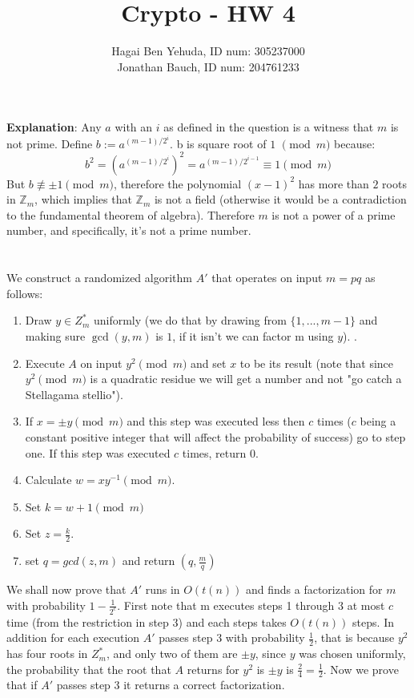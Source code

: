 \documentclass{article}
\title{Crypto - HW 4}
\author{Hagai Ben Yehuda, ID num: 305237000\\ Jonathan Bauch, ID num: 204761233}
\date{}
\begin{document}
  \maketitle

\section{} %


\textbf{Explanation}: Any $a$ with an $i$ as defined in the question is a witness that $m$ is not prime. Define $b := a^{(m-1)/2^i}$.
b is square  root of $1$ $\pmod{m}$ because:
\[ b^2 = (a^{(m-1)/2^i})^2 = a^{(m-1)/2^{i-1}} \equiv 1 \pmod{m} \]
But $b \not \equiv \pm 1 \pmod{m}$, therefore the polynomial $(x-1)^2$ has more than $2$ roots in $\mathbb{Z}_m$, which implies that $\mathbb{Z}_m$ is not a field (otherwise it would be a contradiction to the fundamental theorem of algebra). Therefore $m$ is not a power of a prime number, and specifically, it's not a prime number. 

\section{} %
We construct a randomized algorithm $A'$ that operates on input $m = pq$ as follows:
\begin{enumerate}
\item Draw $y\in Z_{m}^{*}$ uniformly (we do that by drawing from $\{1,...,m-1\}$ and making sure $\gcd(y,m)$ is $1$, if it isn't we can factor m using $y$). .
\item Execute $A$ on input $y^2 \pmod m $ and set $x$ to be its result (note that since $y^2 \pmod m $ is a quadratic residue we will get a number and not  "go catch a Stellagama stellio"). 
\item If $x = \pm y \pmod m$ and this step was executed less then $c$ times ($c$ being a constant positive integer that will affect the probability of success) go to step one. If this step was executed $c$ times, return $0$.
\item Calculate $w = x  y^{-1} \pmod m$.
\item Set $k = w+1 \pmod m$ 
\item Set $z = \frac{k}{2}$.
\item set $q = gcd(z, m)$ and return $(q, \frac{m}{q})$
\end{enumerate} 
We shall now prove that $A'$ runs in $O(t(n))$ and finds a factorization for $m$ with probability $ 1- \frac{1}{2^c}$.
First note that m executes steps 1 through 3 at most $c$ time (from the restriction in step 3) and each steps takes $O(t(n))$ steps.
In addition for each execution $A'$ passes step $3$ with probability $\frac{1}{2}$, that is because $y^2$ has four roots in $Z_{m}^{*}$, and only two of them are $\pm y$, since $y$ was chosen uniformly, the probability that the root that $A$ returns for $y^2$ is $ \pm y$  is  $\frac{2}{4} = \frac{1}{2}$.
Now we prove that if $A'$ passes step 3 it returns a correct factorization.
\end{document}
